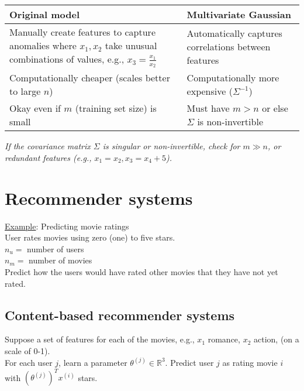\begin{center}
\begin{tabular}{| m{7cm} | m{7cm} | }
\hline
Original model & Multivariate Gaussian\\
\hline
Manually create features to capture anomalies where $x_1, x_2$ take unusual combinations of values, e.g., $x_3 = \frac{x_1}{x_2}$ & Automatically captures correlations between features\\
\hline
Computationally cheaper (scales better to large $n$) & Computationally more expensive ($\Sigma^{-1}$)\\
\hline
Okay even if $m$ (training set size) is small & Must have $m > n$ or else $\Sigma$ is non-invertible\\
\hline
\end{tabular}
\end{center}
\emph{\textcolor{Bittersweet}{If the covariance matrix $\Sigma$ is singular or non-invertible, check for $m \gg n$, or redundant features (e.g., $x_1 = x_2, x_3 = x_4 + 5$).}}

\section{Recommender systems}
\label{sec:Recommender systems}

\underline{Example}: Predicting movie ratings\\
User rates movies using zero (one) to five stars.\\
$n_u = $ number of users\\
$n_m = $ number of movies\\

Predict how the users would have rated other movies that they have not yet rated.

%
\subsection{Content-based recommender systems}
Suppose a set of features for each of the movies, e.g., $x_1$ romance, $x_2$ action, (on a scale of 0-1).\\
For each user $j$, learn a parameter $\theta^{(j)} \in \mathbb{R}^3$. Predict user $j$ as rating movie $i$ with $(\theta^{(j)} )^Tx^{(i)}$ stars.

